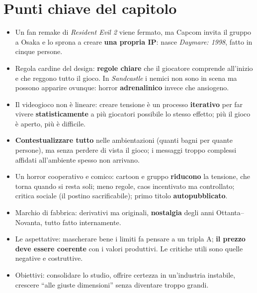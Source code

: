 \section*{Punti chiave del capitolo}

\begin{itemize}
  \item Un fan remake di \emph{Resident Evil 2} viene fermato, ma Capcom invita
        il gruppo a Osaka e lo sprona a creare \textbf{una propria IP}: nasce
        \emph{Daymare: 1998}, fatto in cinque persone.
  \item Regola cardine del design: \textbf{regole chiare} che il giocatore
        comprende all'inizio e che reggono tutto il gioco. In
        \emph{Sandcastle} i nemici non sono in scena ma possono apparire
        ovunque: horror \textbf{adrenalinico} invece che ansiogeno.
  \item Il videogioco non è lineare: creare tensione è un processo
        \textbf{iterativo} per far vivere \textbf{statisticamente} a più
        giocatori possibile lo stesso effetto; più il gioco è aperto, più è
        difficile.
  \item \textbf{Contestualizzare tutto} nelle ambientazioni (quanti bagni per
        quante persone), ma senza perdere di vista il gioco; i messaggi troppo
        complessi affidati all'ambiente spesso non arrivano.
  \item Un horror cooperativo e comico: cartoon e gruppo \textbf{riducono} la
        tensione, che torna quando si resta soli; meno regole, caos
        incentivato ma controllato; critica sociale (il postino sacrificabile);
        primo titolo \textbf{autopubblicato}.
  \item Marchio di fabbrica: derivativi ma originali, \textbf{nostalgia} degli
        anni Ottanta--Novanta, tutto fatto internamente.
  \item Le aspettative: mascherare bene i limiti fa pensare a un tripla A;
        \textbf{il prezzo deve essere coerente} con i valori produttivi. Le
        critiche utili sono quelle negative e costruttive.
  \item Obiettivi: consolidare lo studio, offrire certezza in un'industria
        instabile, crescere ``alle giuste dimensioni'' senza diventare troppo
        grandi.
\end{itemize}
